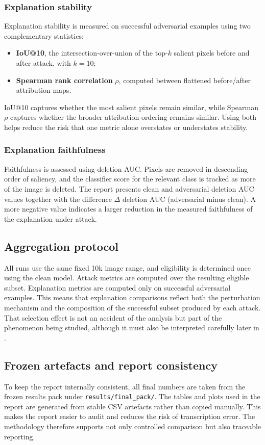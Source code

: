 \subsubsection{Explanation stability}
Explanation stability is measured on successful adversarial examples using two complementary statistics:

\begin{itemize}
  \item \textbf{IoU@10}, the intersection-over-union of the top-$k$ salient pixels before and after attack, with $k=10$;
  \item \textbf{Spearman rank correlation} $\rho$, computed between flattened before/after attribution maps.
\end{itemize}

IoU@10 captures whether the most salient pixels remain similar, while Spearman $\rho$ captures whether the broader attribution ordering remains similar.
Using both helps reduce the risk that one metric alone overstates or understates stability.

\subsubsection{Explanation faithfulness}
Faithfulness is assessed using deletion AUC.
Pixels are removed in descending order of saliency, and the classifier score for the relevant class is tracked as more of the image is deleted.
The report presents clean and adversarial deletion AUC values together with the difference $\Delta$ deletion AUC (adversarial minus clean).
A more negative value indicates a larger reduction in the measured faithfulness of the explanation under attack.

\subsection{Aggregation protocol}
All runs use the same fixed 10k image range, and eligibility is determined once using the clean model.
Attack metrics are computed over the resulting eligible subset.
Explanation metrics are computed only on successful adversarial examples.
This means that explanation comparisons reflect both the perturbation mechanism and the composition of the successful subset produced by each attack.
That selection effect is not an accident of the analysis but part of the phenomenon being studied, although it must also be interpreted carefully later in .

\subsection{Frozen artefacts and report consistency}
To keep the report internally consistent, all final numbers are taken from the frozen results pack under \texttt{results/final\_pack/}.
The tables and plots used in the report are generated from stable CSV artefacts rather than copied manually.
This makes the report easier to audit and reduces the risk of transcription error.
The methodology therefore supports not only controlled comparison but also traceable reporting.
